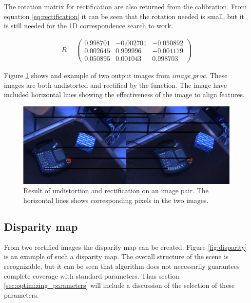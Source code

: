 The rotation matrix for rectification are also returned from the calibration. From equation \ref{eq:rectification} it can be seen that the rotation needed is small, but it is still needed for the 1D correspondence search to work. 

\begin{equation}\label{eq:rectification}
\begin{split}
R =
 \begin{pmatrix}
  0.998701 & -0.002701 & -0.050892 \\
  0.002645 & 0.999996 & -0.001179 \\
  0.050895 & 0.001043 & 0.998703 
 \end{pmatrix}
\end{split}
\end{equation}

Figure \ref{fig:rectified} shows and example of two output images from $image\_proc$. These images are both undistorted and rectified by the function. The image have included horizontal lines showing the effectiveness of the image to align features.

\begin{figure}[h!]
  \centering
    \includegraphics[width=\textwidth]{graphics/06_vision/rectified.jpg}
      \caption{Result of undistortion and rectification on an image pair. The horizontal lines shows corresponding pixels in the two images.}
    \label{fig:rectified}
\end{figure}

\subsection{Disparity map}

From two rectified images the disparity map can be created. Figure \ref{fig:disparity} is an example of such a disparity map. The overall structure of the scene is recognizable, but it can be seen that algorithm does not necessarily guarantees complete coverage with standard parameters. Thus section \ref{sec:optimizing_parameters} will include a discussion of the selection of these parameters.

